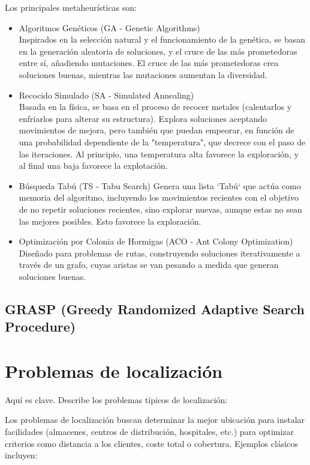 \documentclass[12pt,a4paper]{book}
\begin{document}
Los principales metaheurísticas son:
\begin{itemize}
    \item Algoritmos Genéticos (GA - Genetic Algorithms)\\
    Inspirados en la selección natural y el funcionamiento de la genética, se basan en la generación aleatoria de soluciones, y el cruce de las más prometedoras entre sí, 
    añadiendo mutaciones. El cruce de las más prometedoras crea soluciones buenas, mientras las mutaciones aumentan la diversidad.
    \item Recocido Simulado (SA - Simulated Annealing)\\
    Basada en la física, se basa en el proceso de recocer metales (calentarlos y enfriarlos para alterar su estructura). Explora soluciones aceptando movimientos de mejora, pero también que puedan empeorar, 
    en función de una probabilidad dependiente de la "temperatura", que decrece con el paso de las iteraciones. Al principio, una temperatura alta favorece la exploración, y al final una baja favorece la explotación.
    \item Búsqueda Tabú (TS - Tabu Search)
    Genera una lista `Tabú` que actúa como memoria del algoritmo, incluyendo los movimientos recientes con el objetivo de no repetir soluciones recientes, sino explorar nuevas, aunque estas no sean las mejores posibles. Esto favorece la exploración.
    \item Optimización por Colonia de Hormigas (ACO - Ant Colony Optimization)
    Diseñado para problemas de rutas, construyendo soluciones iterativamente a través de un grafo, cuyas aristas  se van pesando a medida que generan soluciones buenas.
\end{itemize}


\subsection{GRASP (Greedy Randomized Adaptive Search Procedure)}

\section{Problemas de localización}
Aquí es clave. Describe los problemas típicos de localización:

Los problemas de localización buscan determinar la mejor ubicación para instalar facilidades (almacenes, centros de distribución, hospitales, etc.) para optimizar criterios como distancia a los clientes, coste total o cobertura. Ejemplos clásicos incluyen:
\end{document}
